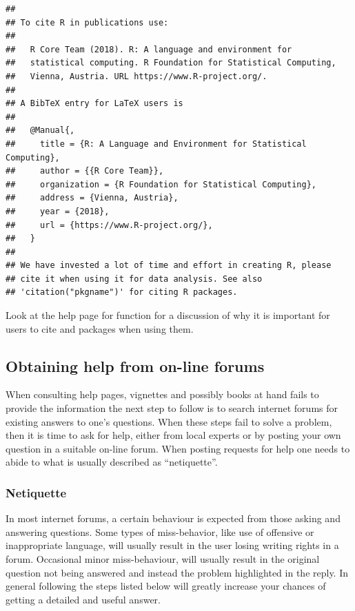 \documentclass[krantz2]{krantz}\usepackage{knitr}%
\begin{document}
\begin{knitrout}\footnotesize
{}\color{fgcolor}\begin{kframe}
\begin{alltt}
\hlstd{()}
\end{alltt}
\begin{verbatim}
## 
## To cite R in publications use:
## 
##   R Core Team (2018). R: A language and environment for
##   statistical computing. R Foundation for Statistical Computing,
##   Vienna, Austria. URL https://www.R-project.org/.
## 
## A BibTeX entry for LaTeX users is
## 
##   @Manual{,
##     title = {R: A Language and Environment for Statistical Computing},
##     author = {{R Core Team}},
##     organization = {R Foundation for Statistical Computing},
##     address = {Vienna, Austria},
##     year = {2018},
##     url = {https://www.R-project.org/},
##   }
## 
## We have invested a lot of time and effort in creating R, please
## cite it when using it for data analysis. See also
## 'citation("pkgname")' for citing R packages.
\end{verbatim}
\end{kframe}
\end{knitrout}

\begin{playground}
  Look at the help page for function  for a discussion of why it is important for users to cite \Rpgrm and packages when using them.
\end{playground}

\subsection{Obtaining help from on-line forums}

When consulting help pages, vignettes and possibly books at hand fails to provide the information the next step to follow is to search internet forums for existing answers to one's questions. When these steps fail to solve a problem, then it is time to ask for help, either from local experts or by posting your own question in a suitable on-line forum. When posting requests for help one needs to abide to what is usually described as ``netiquette''.

\subsubsection{Netiquette}
In most internet forums, a certain behaviour is expected from those asking and answering questions. Some types of miss-behavior, like use of offensive or inappropriate language, will usually result in the user losing writing rights in a forum. Occasional minor miss-behaviour, will usually result in the original question not being answered and instead the problem highlighted in the reply. In general following the steps listed below will greatly increase your chances of getting a detailed and useful answer.
\end{document}
